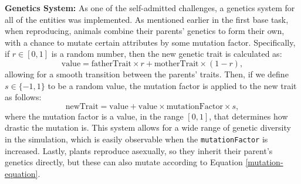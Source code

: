 \documentclass[10pt, a4paper]{scrartcl}
\begin{document}
\begin{multicols}{2}
    \noindent \textbf{Genetics System:} As one of the self-admitted challenges, a genetics system for all of the entities
    was implemented. As mentioned earlier in the first base task, when reproducing, animals combine their parents' genetics
    to form their own, with a chance to mutate certain attributes by some mutation factor. Specifically, if \( r \in [0, 1] \)
    is a random number, then the new genetic trait is calculated as:
    \begin{equation}
      \text{value} = \text{fatherTrait} \times r + \text{motherTrait} \times (1 - r), \nonumber
    \end{equation}
    allowing for a smooth transition between the parents' traits. Then, if we define \( s \in \{-1, 1\} \) to be a random
    value, the mutation factor is applied to the new trait as follows:
    \begin{equation}
      \label{mutation-equation}
      \text{newTrait} = \text{value} + \text{value} \times \text{mutationFactor} \times s,
    \end{equation}
    where the mutation factor is a value, in the range \( [0, 1] \), that determines how drastic the mutation is.
    This system allows for a wide range of genetic diversity in the simulation, which is easily observable when
    the \verb|mutationFactor| is increased. Lastly, plants reproduce asexually, so they inherit their parent's genetics
    directly, but these can also mutate according to Equation \ref{mutation-equation}.


\end{multicols}
\end{document}
